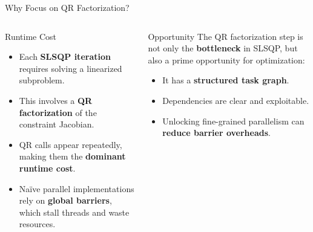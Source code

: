 \begin{frame}{Why Focus on QR Factorization?}
	
	\pause
	\begin{columns}[T,onlytextwidth]
		\begin{block}{Runtime Cost}
		  \begin{itemize}\setlength{\itemsep}{6pt}
		    \item Each \textbf{SLSQP iteration} requires solving a linearized subproblem.  
		    \item This involves a \textbf{QR factorization} of the constraint Jacobian.  
		    \item QR calls appear repeatedly, making them the \textbf{dominant runtime cost}.  
		    \item Naïve parallel implementations rely on \textbf{global barriers}, which stall threads and waste resources.
		  \end{itemize}
		  \vfill
		\end{block}
	
		\pause
	
		\begin{block}{Opportunity}
		  The QR factorization step is not only the \textbf{bottleneck} in SLSQP,  
		  but also a prime opportunity for optimization:
		  \begin{itemize}\setlength{\itemsep}{6pt}
		    \item It has a \textbf{structured task graph}.  
		    \item Dependencies are clear and exploitable.  
		    \item Unlocking fine-grained parallelism can \textbf{reduce barrier overheads}.
		  \end{itemize}
		\end{block}
		\end{columns}
\end{frame}
